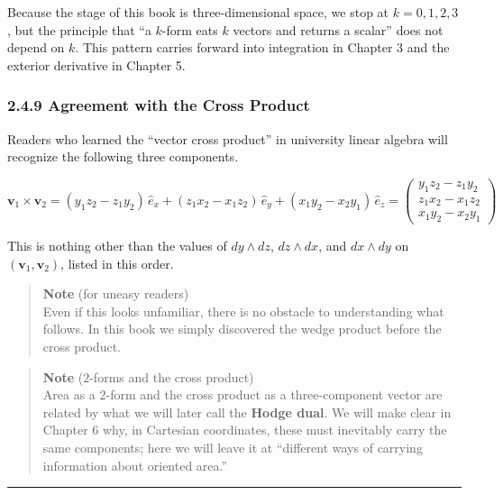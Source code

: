 Because the stage of this book is three-dimensional space, we stop at
\(k=0,1,2,3\), but the principle that ``a \(k\)-form eats \(k\) vectors
and returns a scalar'' does not depend on \(k\). This pattern carries
forward into integration in Chapter 3 and the exterior derivative in
Chapter 5.

\hypertarget{agreement-with-the-cross-product}{%
\subsubsection{2.4.9 Agreement with the Cross
Product}\label{agreement-with-the-cross-product}}

Readers who learned the ``vector cross product'' in university linear
algebra will recognize the following three components.

\[\mathbf{v}_1 \times \mathbf{v}_2 = (y_1 z_2 - z_1 y_2)\,\hat{e}_x + (z_1 x_2 - x_1 z_2)\,\hat{e}_y + (x_1 y_2 - x_2 y_1)\,\hat{e}_z = \begin{pmatrix} y_1 z_2 - z_1 y_2 \\ z_1 x_2 - x_1 z_2 \\ x_1 y_2 - x_2 y_1 \end{pmatrix}\]

This is nothing other than the values of \(dy \wedge dz\),
\(dz \wedge dx\), and \(dx \wedge dy\) on
\((\mathbf{v}_1,\mathbf{v}_2)\), listed in this order.

\begin{quote}
\textbf{Note} (for uneasy readers)\\
Even if this looks unfamiliar, there is no obstacle to understanding
what follows. In this book we simply discovered the wedge product before
the cross product.
\end{quote}

\begin{quote}
\textbf{Note} (\(2\)-forms and the cross product)\\
Area as a \(2\)-form and the cross product as a three-component vector
are related by what we will later call the \textbf{Hodge dual}. We will
make clear in Chapter 6 why, in Cartesian coordinates, these must
inevitably carry the same components; here we will leave it at
``different ways of carrying information about oriented area.''
\end{quote}

\begin{center}\rule{0.5\linewidth}{0.5pt}\end{center}

